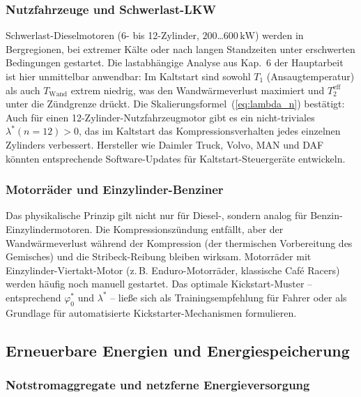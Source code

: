 ﻿\documentclass[a4paper,12pt]{article}
\begin{document}
\subsubsection{Nutzfahrzeuge und Schwerlast-LKW}

Schwerlast-Dieselmotoren (6- bis 12-Zylinder, $200$\ldots$600\,\text{kW}$)
werden in Bergregionen, bei extremer Kälte oder nach langen Standzeiten
unter erschwerten Bedingungen gestartet. Die lastabhängige Analyse
aus Kap.~6 der Hauptarbeit ist hier unmittelbar anwendbar: Im Kaltstart
sind sowohl $T_1$ (Ansaugtemperatur) als auch $T_\text{Wand}$ extrem
niedrig, was den Wandwärmeverlust maximiert und $T_2^\text{eff}$
unter die Zündgrenze drückt. Die Skalierungsformel~(\ref{eq:lambda_n})
bestätigt: Auch für einen 12-Zylinder-Nutzfahrzeugmotor gibt es ein
nicht-triviales $\lambda^*(n=12) > 0$, das im Kaltstart das
Kompressionsverhalten jedes einzelnen Zylinders verbessert.
Hersteller wie Daimler Truck, Volvo, MAN und DAF könnten
entsprechende Software-Updates für Kaltstart-Steuergeräte entwickeln.

\subsubsection{Motorräder und Einzylinder-Benziner}

Das physikalische Prinzip gilt nicht nur für Diesel-,
sondern analog für Benzin-Einzylindermotoren. Die Kompressionszündung
entfällt, aber der Wandwärmeverlust während der Kompression
(der thermischen Vorbereitung des Gemisches) und die
Stribeck-Reibung bleiben wirksam. Motorräder mit Einzylinder-Viertakt-Motor
(z.\,B. Enduro-Motorräder, klassische Café Racers) werden häufig noch
manuell gestartet. Das optimale Kickstart-Muster -- entsprechend
$\varphi_0^*$ und $\lambda^*$ -- ließe sich als Trainingsempfehlung
für Fahrer oder als Grundlage für automatisierte Kickstarter-Mechanismen
formulieren.

\subsection{Erneuerbare Energien und Energiespeicherung}

\subsubsection{Notstromaggregate und netzferne Energieversorgung}
\end{document}
